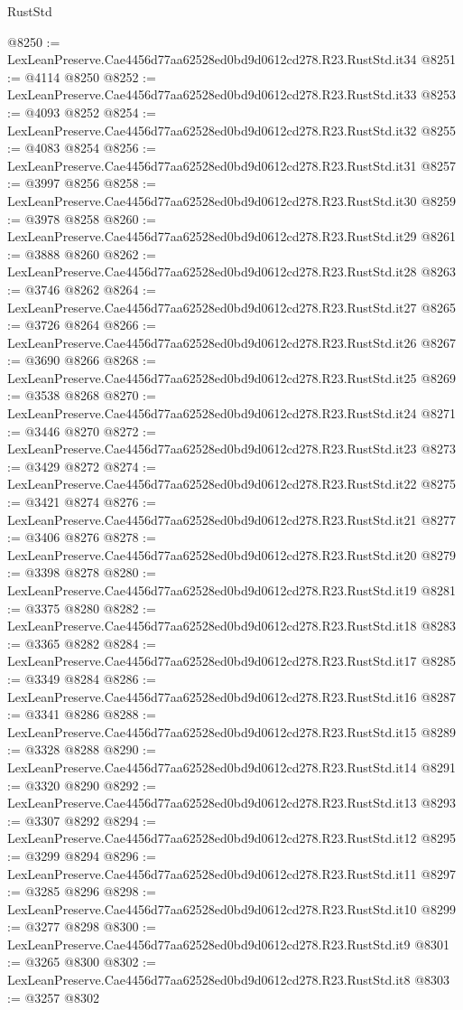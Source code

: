 \begin{lexlean}{RustStd}
\begin{coremodule}
@8250 := LexLeanPreserve.Cae4456d77aa62528ed0bd9d0612cd278.R23.RustStd.it34
@8251 := @4114 @8250
@8252 := LexLeanPreserve.Cae4456d77aa62528ed0bd9d0612cd278.R23.RustStd.it33
@8253 := @4093 @8252
@8254 := LexLeanPreserve.Cae4456d77aa62528ed0bd9d0612cd278.R23.RustStd.it32
@8255 := @4083 @8254
@8256 := LexLeanPreserve.Cae4456d77aa62528ed0bd9d0612cd278.R23.RustStd.it31
@8257 := @3997 @8256
@8258 := LexLeanPreserve.Cae4456d77aa62528ed0bd9d0612cd278.R23.RustStd.it30
@8259 := @3978 @8258
@8260 := LexLeanPreserve.Cae4456d77aa62528ed0bd9d0612cd278.R23.RustStd.it29
@8261 := @3888 @8260
@8262 := LexLeanPreserve.Cae4456d77aa62528ed0bd9d0612cd278.R23.RustStd.it28
@8263 := @3746 @8262
@8264 := LexLeanPreserve.Cae4456d77aa62528ed0bd9d0612cd278.R23.RustStd.it27
@8265 := @3726 @8264
@8266 := LexLeanPreserve.Cae4456d77aa62528ed0bd9d0612cd278.R23.RustStd.it26
@8267 := @3690 @8266
@8268 := LexLeanPreserve.Cae4456d77aa62528ed0bd9d0612cd278.R23.RustStd.it25
@8269 := @3538 @8268
@8270 := LexLeanPreserve.Cae4456d77aa62528ed0bd9d0612cd278.R23.RustStd.it24
@8271 := @3446 @8270
@8272 := LexLeanPreserve.Cae4456d77aa62528ed0bd9d0612cd278.R23.RustStd.it23
@8273 := @3429 @8272
@8274 := LexLeanPreserve.Cae4456d77aa62528ed0bd9d0612cd278.R23.RustStd.it22
@8275 := @3421 @8274
@8276 := LexLeanPreserve.Cae4456d77aa62528ed0bd9d0612cd278.R23.RustStd.it21
@8277 := @3406 @8276
@8278 := LexLeanPreserve.Cae4456d77aa62528ed0bd9d0612cd278.R23.RustStd.it20
@8279 := @3398 @8278
@8280 := LexLeanPreserve.Cae4456d77aa62528ed0bd9d0612cd278.R23.RustStd.it19
@8281 := @3375 @8280
@8282 := LexLeanPreserve.Cae4456d77aa62528ed0bd9d0612cd278.R23.RustStd.it18
@8283 := @3365 @8282
@8284 := LexLeanPreserve.Cae4456d77aa62528ed0bd9d0612cd278.R23.RustStd.it17
@8285 := @3349 @8284
@8286 := LexLeanPreserve.Cae4456d77aa62528ed0bd9d0612cd278.R23.RustStd.it16
@8287 := @3341 @8286
@8288 := LexLeanPreserve.Cae4456d77aa62528ed0bd9d0612cd278.R23.RustStd.it15
@8289 := @3328 @8288
@8290 := LexLeanPreserve.Cae4456d77aa62528ed0bd9d0612cd278.R23.RustStd.it14
@8291 := @3320 @8290
@8292 := LexLeanPreserve.Cae4456d77aa62528ed0bd9d0612cd278.R23.RustStd.it13
@8293 := @3307 @8292
@8294 := LexLeanPreserve.Cae4456d77aa62528ed0bd9d0612cd278.R23.RustStd.it12
@8295 := @3299 @8294
@8296 := LexLeanPreserve.Cae4456d77aa62528ed0bd9d0612cd278.R23.RustStd.it11
@8297 := @3285 @8296
@8298 := LexLeanPreserve.Cae4456d77aa62528ed0bd9d0612cd278.R23.RustStd.it10
@8299 := @3277 @8298
@8300 := LexLeanPreserve.Cae4456d77aa62528ed0bd9d0612cd278.R23.RustStd.it9
@8301 := @3265 @8300
@8302 := LexLeanPreserve.Cae4456d77aa62528ed0bd9d0612cd278.R23.RustStd.it8
@8303 := @3257 @8302

\end{coremodule}
\end{lexlean}

